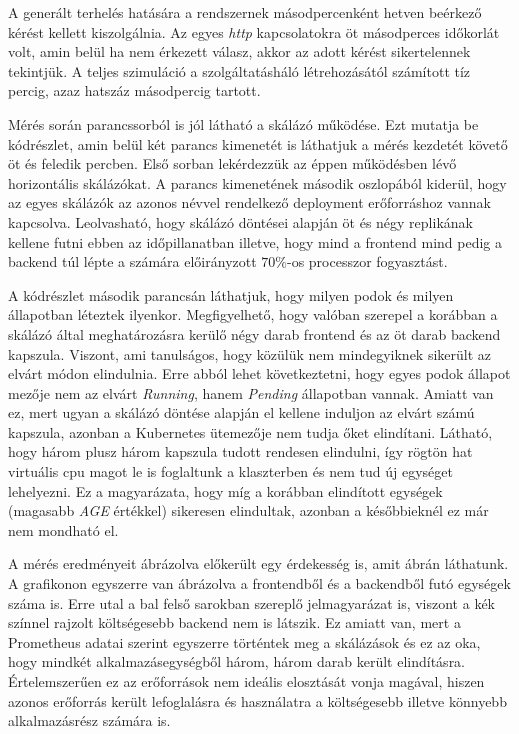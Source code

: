 A generált terhelés hatására a rendszernek másodpercenként hetven beérkező kérést kellett kiszolgálnia. 
Az egyes \textit{http} kapcsolatokra öt másodperces időkorlát volt, amin belül ha nem érkezett válasz, akkor az adott kérést sikertelennek tekintjük.
A teljes szimuláció a szolgáltatásháló létrehozásától számított tíz percig, azaz hatszáz másodpercig tartott.

Mérés során parancssorból is jól látható a skálázó működése. 
Ezt mutatja be  kódrészlet, amin belül két parancs kimenetét is láthatjuk a mérés kezdetét követő öt és feledik percben.
Első sorban lekérdezzük az éppen működésben lévő horizontális skálázókat. 
A parancs kimenetének második oszlopából kiderül, hogy az egyes skálázók az azonos névvel rendelkező deployment erőforráshoz vannak kapcsolva.
Leolvasható, hogy skálázó döntései alapján öt és négy replikának kellene futni ebben az időpillanatban illetve, hogy mind a frontend mind pedig a backend túl lépte a számára előirányzott $70\%$-os processzor fogyasztást.

A kódrészlet második parancsán láthatjuk, hogy milyen podok és milyen állapotban léteztek ilyenkor.
Megfigyelhető, hogy valóban szerepel a korábban a skálázó által meghatározásra kerülő négy darab frontend és az öt darab backend kapszula.
Viszont, ami tanulságos, hogy közülük nem mindegyiknek sikerült az elvárt módon elindulnia.
Erre abból lehet következtetni, hogy egyes podok állapot mezője nem az elvárt \textit{Running}, hanem \textit{Pending} állapotban vannak.
Amiatt van ez, mert ugyan a skálázó döntése alapján el kellene induljon az elvárt számú kapszula, azonban a Kubernetes ütemezője nem tudja őket elindítani.
Látható, hogy három plusz három kapszula tudott rendesen elindulni, így rögtön hat virtuális cpu magot le is foglaltunk a klaszterben és nem tud új egységet lehelyezni.
Ez a magyarázata, hogy míg a korábban elindított egységek (magasabb \textit{AGE} értékkel) sikeresen elindultak, azonban a későbbieknél ez már nem mondható el.\\

\lstset{caption=Horizontális skálázóval történő mérés, label=hpa_measurement_pending}


A mérés eredményeit ábrázolva előkerült egy érdekesség is, amit  ábrán láthatunk.
A grafikonon egyszerre van ábrázolva a frontendből és a backendből futó egységek száma is.
Erre utal a bal felső sarokban szereplő jelmagyarázat is, viszont a kék színnel rajzolt költségesebb backend nem is látszik.
Ez amiatt van, mert a Prometheus adatai szerint egyszerre történtek meg a skálázások és ez az oka, hogy mindkét alkalmazásegységből három, három darab került elindításra.
Értelemszerűen ez az erőforrások nem ideális elosztását vonja magával, hiszen azonos erőforrás került lefoglalásra és használatra a költségesebb illetve könnyebb alkalmazásrész számára is.

